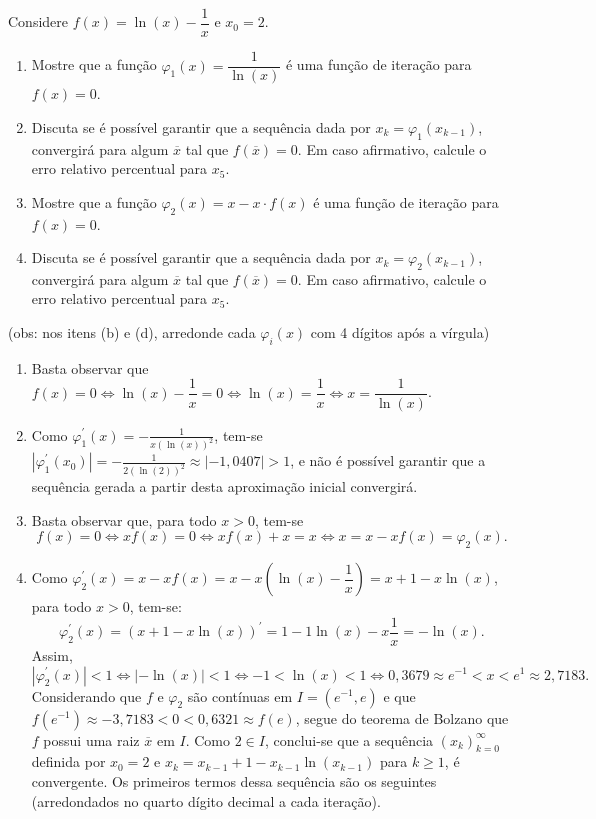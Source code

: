 \documentclass[12pt,a4paper]{article}
\begin{document}
\begin{ExerciseList}
\Exercise[title={2,5}] Considere $f(x) = \ln(x) - \dfrac{1}{x}$ e $x_0 = 2$.
\begin{enumerate}
\item Mostre que a função $\varphi_1(x) = \dfrac{1}{\ln(x)}$ é uma função de iteração para $f(x) = 0$.
\item Discuta se é possível garantir que a sequência dada por $x_k = \varphi_1(x_{k-1})$, convergirá para algum $\overline{x}$ tal que $f(\overline{x}) = 0$. Em caso afirmativo, calcule o erro relativo percentual para $x_5$.
\item Mostre que a função $\varphi_2(x) = x - x \cdot f(x)$ é uma função de iteração para $f(x) = 0$.
\item Discuta se é possível garantir que a sequência dada por $x_k = \varphi_2(x_{k-1})$, convergirá para algum $\overline{x}$ tal que $f(\overline{x}) = 0$. Em caso afirmativo, calcule o erro relativo percentual para $x_5$.
\end{enumerate}
(obs: nos itens (b) e (d), arredonde cada $\varphi_i(x)$ com 4 dígitos após a vírgula)
\Answer

\begin{enumerate}
\item Basta observar que $
f(x) = 0
\Leftrightarrow
\ln(x) - \dfrac{1}{x} = 0
\Leftrightarrow
\ln(x) = \dfrac{1}{x}
\Leftrightarrow
x = \dfrac{1}{\ln(x)}$.

\item Como $\varphi_1^\prime(x) = -\frac{1}{x (\ln(x))^2}$, tem-se $|\varphi_1^\prime(x_0)| = -\frac{1}{2 (\ln(2))^2} \approx |-1,0407| > 1$, e não é possível garantir que a sequência gerada a partir desta aproximação inicial convergirá.

\item Basta observar que, para todo $x > 0$, tem-se
\[
f(x) = 0
\Leftrightarrow
x f(x) = 0
\Leftrightarrow
x f(x) + x = x
\Leftrightarrow
x = x - x f(x) = \varphi_2(x).
\]

\item Como $\varphi_2^\prime(x) = x - x f(x) = x - x\left(\ln(x) - \dfrac{1}{x}\right) = x+1-x\ln(x)$, para todo $x>0$, tem-se:
\[
\varphi_2^\prime(x)
= (x+1-x\ln(x))^\prime
= 1-1\ln(x)-x\frac{1}{x}
= -\ln(x).
\]
Assim,
\[
|\varphi_2^\prime(x)| < 1
\Leftrightarrow
|-\ln(x)| < 1
\Leftrightarrow
-1 < \ln(x) < 1
\Leftrightarrow
0,3679 \approx e^{-1} < x < e^1 \approx 2,7183.
\]
Considerando que $f$ e $\varphi_2$ são contínuas em $I = (e^{-1}, e )$ e que $f(e^{-1}) \approx -3,7183 < 0 < 0,6321 \approx f(e)$, segue do teorema de Bolzano que $f$ possui uma raiz $\overline{x}$ em $I$. Como $2 \in I$, conclui-se que a sequência $(x_k)_{k=0}^\infty$ definida por $x_0 = 2$ e $x_k = x_{k-1}+1-x_{k-1}\ln(x_{k-1})$ para $k \geq 1$, é convergente. Os primeiros termos dessa sequência são os seguintes (arredondados no quarto dígito decimal a cada iteração).


\end{enumerate}
\end{ExerciseList}
\end{document}
